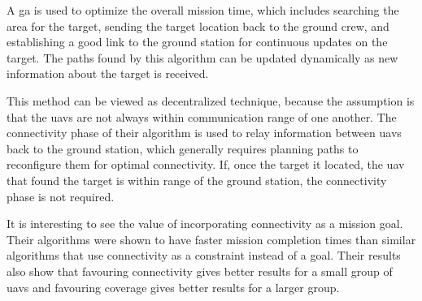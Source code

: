 A \acf{ga} is used to optimize the overall mission time, which includes searching the area for the target, sending the target location back to the ground crew, and establishing a good link to the ground station for continuous updates on the target. The paths found by this algorithm can be updated dynamically as new information about the target is received.

This method can be viewed as decentralized technique, because the assumption is that the \acp{uav} are not always within communication range of one another. The connectivity phase of their algorithm is used to relay information between \acp{uav} back to the ground station, which generally requires planning paths to reconfigure them for optimal connectivity. If, once the target it located, the \ac{uav} that found the target is within range of the ground station, the connectivity phase is not required.

It is interesting to see the value of incorporating connectivity as a mission goal. Their algorithms were shown to have faster mission completion times than similar algorithms that use connectivity as a constraint instead of a goal. Their results also show that favouring connectivity gives better results for a small group of \acp{uav} and favouring coverage gives better results for a larger group.

